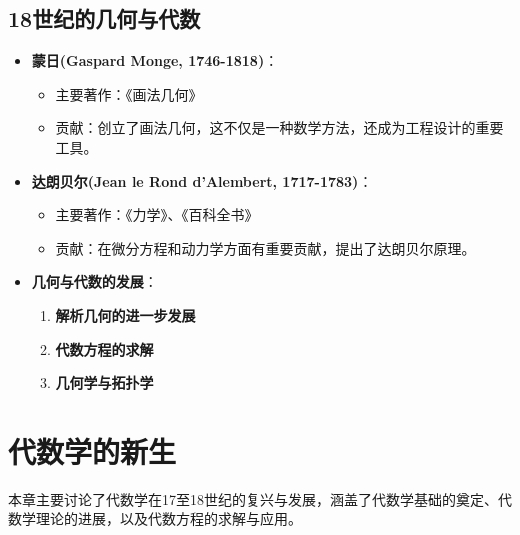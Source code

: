 \documentclass{Math_Note}
\begin{document}
\subsection{18世纪的几何与代数}
\begin{itemize}
    \item \textbf{蒙日(Gaspard Monge, 1746-1818)}：
    \begin{itemize}
        \item 主要著作：《画法几何》
        \item 贡献：创立了画法几何，这不仅是一种数学方法，还成为工程设计的重要工具。
    \end{itemize}
    
    \item \textbf{达朗贝尔(Jean le Rond d'Alembert, 1717-1783)}：
    \begin{itemize}
        \item 主要著作：《力学》、《百科全书》
        \item 贡献：在微分方程和动力学方面有重要贡献，提出了达朗贝尔原理。
    \end{itemize}
    
    \item \textbf{几何与代数的发展}：
    \begin{enumerate}
        \item \textbf{解析几何的进一步发展}
        \item \textbf{代数方程的求解}
        \item \textbf{几何学与拓扑学}
    \end{enumerate}
\end{itemize}

\section{代数学的新生}
本章主要讨论了代数学在17至18世纪的复兴与发展，涵盖了代数学基础的奠定、代数学理论的进展，以及代数方程的求解与应用。
\end{document}
